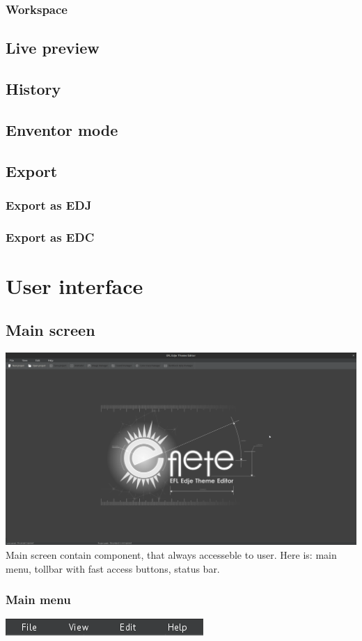 \documentclass[titlepage,oneside,11pt]{book}
\begin{document}
\subsection{Workspace}
\section{Live preview}
\section{History}
\section{Enventor mode}
\section{Export}
\subsection{Export as EDJ}
\subsection{Export as EDC}
\chapter{User interface}
\section{Main screen}
\includegraphics[scale=0.2]{images/main_screen.png}
Main screen contain component, that always accesseble to user. Here is: main menu, tollbar with fast access buttons, status bar.
\subsection{Main menu}
\includegraphics{images/main_menu.png}
\end{document}

